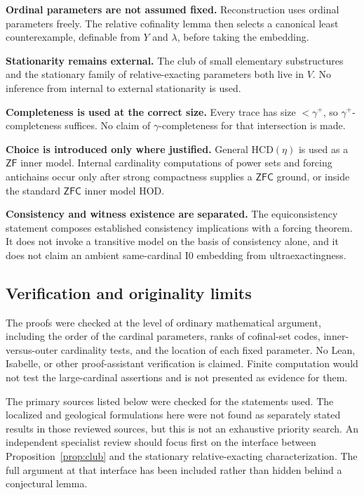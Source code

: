 \documentclass[11pt,letterpaper]{article}
\theoremstyle{definition}
\newcommand{\ZFC}{\mathsf{ZFC}}
\newcommand{\ZF}{\mathsf{ZF}}
\newcommand{\Izero}{\mathrm{I0}}
\newcommand{\HCD}{\mathrm{HCD}}
\begin{document}
\textbf{Ordinal parameters are not assumed fixed.} Reconstruction uses ordinal parameters freely. The relative cofinality lemma then selects a canonical least counterexample, definable from $Y$ and $\lambda$, before taking the embedding.

\textbf{Stationarity remains external.} The club of small elementary substructures and the stationary family of relative-exacting parameters both live in $V$. No inference from internal to external stationarity is used.

\textbf{Completeness is used at the correct size.} Every trace has size $<\gamma^+$, so $\gamma^+$-completeness suffices. No claim of $\gamma$-completeness for that intersection is made.

\textbf{Choice is introduced only where justified.} General $\HCD(\eta)$ is used as a $\ZF$ inner model. Internal cardinality computations of power sets and forcing antichains occur only after strong compactness supplies a $\ZFC$ ground, or inside the standard $\ZFC$ inner model HOD.

\textbf{Consistency and witness existence are separated.} The equiconsistency statement composes established consistency implications with a forcing theorem. It does not invoke a transitive model on the basis of consistency alone, and it does not claim an ambient same-cardinal $\Izero$ embedding from ultraexactingness.

\subsection{Verification and originality limits}

The proofs were checked at the level of ordinary mathematical argument, including the order of the cardinal parameters, ranks of cofinal-set codes, inner-versus-outer cardinality tests, and the location of each fixed parameter. No Lean, Isabelle, or other proof-assistant verification is claimed. Finite computation would not test the large-cardinal assertions and is not presented as evidence for them.

The primary sources listed below were checked for the statements used. The localized and geological formulations here were not found as separately stated results in those reviewed sources, but this is not an exhaustive priority search. An independent specialist review should focus first on the interface between Proposition~\ref{prop:club} and the stationary relative-exacting characterization. The full argument at that interface has been included rather than hidden behind a conjectural lemma.
\end{document}
